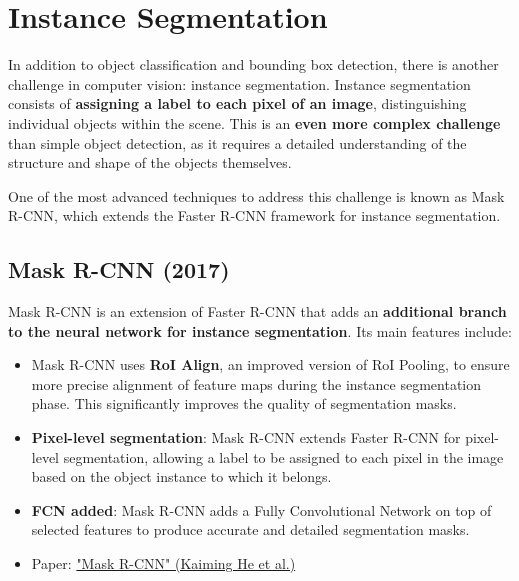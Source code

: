 \section{Instance Segmentation}

In addition to object classification and bounding box detection, there is another challenge in computer vision: instance segmentation. Instance segmentation consists of \textbf{assigning a label to each pixel of an image}, distinguishing individual objects within the scene. This is an \textbf{even more complex challenge} than simple object detection, as it requires a detailed understanding of the structure and shape of the objects themselves.

One of the most advanced techniques to address this challenge is known as Mask R-CNN, which extends the Faster R-CNN framework for instance segmentation. 

\subsection{Mask R-CNN (2017)}

Mask R-CNN is an extension of Faster R-CNN that adds an \textbf{additional branch to the neural network for instance segmentation}. Its main features include:

\begin{itemize}
    \item Mask R-CNN uses \textbf{RoI Align}, an improved version of RoI Pooling, to ensure more precise alignment of feature maps during the instance segmentation phase. This significantly improves the quality of segmentation masks.
    \item \textbf{Pixel-level segmentation}: Mask R-CNN extends Faster R-CNN for pixel-level segmentation, allowing a label to be assigned to each pixel in the image based on the object instance to which it belongs.
    \item \textbf{FCN added}: Mask R-CNN adds a Fully Convolutional Network on top of selected features to produce accurate and detailed segmentation masks.
    \item Paper: \href{https://arxiv.org/pdf/1703.06870.pdf}{"Mask R-CNN" (Kaiming He et al.)}
\end{itemize}

